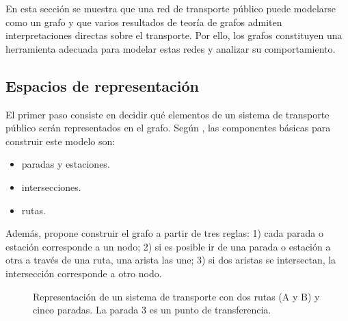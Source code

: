         En esta sección se muestra que una red de transporte público puede modelarse como un grafo y que varios resultados de teoría de grafos admiten interpretaciones directas sobre el transporte. Por ello, los grafos constituyen una herramienta adecuada para modelar estas redes y analizar su comportamiento.

        \subsection{Espacios de representación}
            El primer paso consiste en decidir qué elementos de un sistema de transporte público serán representados en el grafo. Según \cite{rodrigues2020}, las componentes básicas para construir este modelo son:

            \begin{itemize}
                \item paradas y estaciones.
                \item intersecciones.
                \item rutas.
            \end{itemize}

            Además, propone construir el grafo a partir de tres reglas: 1) cada parada o estación corresponde a un nodo; 2) si es posible ir de una parada o estación a otra a través de una ruta, una arista las une; 3) si dos aristas se intersectan, la intersección corresponde a otro nodo.

            \begin{figure}[H]
                \centering
                \caption{Representación de un sistema de transporte con dos rutas (A y B) y cinco paradas. La parada 3 es un punto de transferencia.}
                \label{fig:transporte_conceptual}
            \end{figure}

